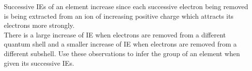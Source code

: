 \documentclass[../main]{subfiles}
\begin{document}
	Successive IEs of an element increase since each successive electron being removed is being extracted from an ion of increasing positive charge which attracts its electrons more strongly. \\

	There is a large increase of IE when electrons are removed from a different quantum shell and a smaller increase of IE when electrons are removed from a different subshell. Use these observations to infer the group of an element when given its successive IEs. \\
\end{document}
